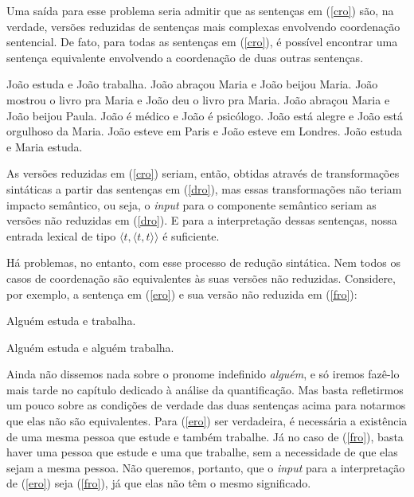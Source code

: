 Uma saída para esse problema seria admitir que as senten\-ças em
(\ref{cro}) são, na verdade, versões reduzidas de senten\-ças mais
complexas envolvendo coordena\-ção sentencial. De fato, para todas
as senten\-ças em (\ref{cro}), é possível encontrar uma senten\-ça
equivalente envolvendo a coordena\-ção de duas outras senten\-ças.

\begin{exe}
\ex\label{dro}
\begin{xlist}
\ex João estuda e João trabalha.\label{droa}
\ex João abraçou Maria e João beijou Maria.\label{drob}
\ex João mostrou o livro pra Maria e João deu o livro pra Maria.\label{droc}
\ex João abraçou Maria e João beijou Paula.\label{drod}
\ex João é médico e João é psicólogo.\label{droe}
\ex João está alegre e João está orgulhoso da Maria.\label{drof}
\ex João esteve em Paris e João esteve em Londres.\label{drog}
\ex João estuda e Maria estuda.\label{droh}

\end{xlist}
\end{exe}

\n As versões reduzidas em (\ref{cro}) seriam, então, obtidas
através de transforma\-çõ\-es sintáticas a partir das senten\-ças
em (\ref{dro}), mas essas transforma\-çõ\-es não teriam impacto
semântico, ou seja, o \textit{input} para o componente semântico
seriam as versões não reduzidas em (\ref{dro}). E para a
interpreta\-ção dessas senten\-ças, nossa entrada lexical de tipo
$\langle t,\langle t,t\rangle\rangle$ é suficiente.

Há problemas, no entanto, com esse processo de redu\-ção
sintática. Nem todos os casos de coordena\-ção são equivalentes às
suas versões não reduzidas. Considere, por exemplo, a senten\-ça
em (\ref{ero}) e sua versão não reduzida em (\ref{fro}):

\begin{exe}
\ex Alguém estuda e trabalha.\label{ero}

\ex Alguém estuda e alguém trabalha.\label{fro}
\end{exe}

Ainda não dissemos nada sobre o pronome indefinido \textit{alguém}, e só
iremos fazê-lo mais tarde no capítulo dedicado à análise da
quantifica\-ção. Mas basta refletirmos um pouco sobre as
condi\-çõ\-es de verdade das duas senten\-ças acima para notarmos
que elas não são equivalentes. Para (\ref{ero}) ser verdadeira, é
necessária a existência de uma mesma pessoa que estude e também
trabalhe. Já no caso de (\ref{fro}), basta haver uma pessoa que
estude e uma que trabalhe, sem a necessidade de que elas sejam a mesma pessoa. Não queremos, portanto, que o
\textit{input} para a interpreta\-ção de (\ref{ero}) seja (\ref{fro}), já
que elas não têm o mesmo significado.

